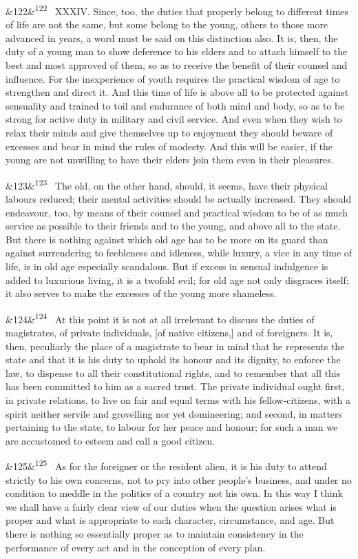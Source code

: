 \documentclass[12pt]{article}
\newcommand{\para}[1][]{\par\noindent\ifx&#1&\else\textsuperscript{\footnotesize #1}~\fi}
\begin{document}
\para[122] XXXIV. Since, too, the duties that properly belong to different times of life are not the same, but some belong to the young, others to those more advanced in years, a word must be said on this distinction also. It is, then, the duty of a young man to show deference to his elders and to attach himself to the best and most approved of them, so as to receive the benefit of their counsel and influence. For the inexperience of youth requires the practical wisdom of age to strengthen and direct it. And this time of life is above all to be protected against sensuality and trained to toil and endurance of both mind and body, so as to be strong for active duty in military and civil service. And even when they wish to relax their minds and give themselves up to enjoyment they should beware of excesses and bear in mind the rules of modesty. And this will be easier, if the young are not unwilling to have their elders join them even in their pleasures.

\para[123] The old, on the other hand, should, it seems, have their physical labours reduced; their mental activities should be actually increased. They should endeavour, too, by means of their counsel and practical wisdom to be of as much service as possible to their friends and to the young, and above all to the state. But there is nothing against which old age has to be more on its guard than against surrendering to feebleness and idleness, while luxury, a vice in any time of life, is in old age especially scandalous. But if excess in sensual indulgence is added to luxurious living, it is a twofold evil; for old age not only disgraces itself; it also serves to make the excesses of the young more shameless.

\para[124] At this point it is not at all irrelevant to discuss the duties of magistrates, of private individuals, [of native citizens,] and of foreigners. It is, then, peculiarly the place of a magistrate to bear in mind that he represents the state and that it is his duty to uphold its honour and its dignity, to enforce the law, to dispense to all their constitutional rights, and to remember that all this has been committed to him as a sacred trust. The private individual ought first, in private relations, to live on fair and equal terms with his fellow-citizens, with a spirit neither servile and grovelling nor yet domineering; and second, in matters pertaining to the state, to labour for her peace and honour; for such a man we are accustomed to esteem and call a good citizen.

\para[125] As for the foreigner or the resident alien, it is his duty to attend strictly to his own concerns, not to pry into other people's business, and under no condition to meddle in the politics of a country not his own. In this way I think we shall have a fairly clear view of our duties when the question arises what is proper and what is appropriate to each character, circumstance, and age. But there is nothing so essentially proper as to maintain consistency in the performance of every act and in the conception of every plan.
\end{document}

